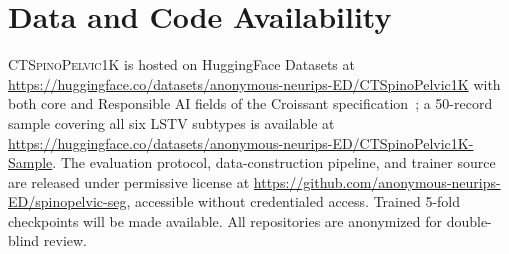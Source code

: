 \documentclass{article}
\newcommand{\dataset}{\textsc{CTSpinoPelvic1K}}
\begin{document}
\section*{Data and Code Availability}

\dataset{} is hosted on HuggingFace Datasets at
\url{https://huggingface.co/datasets/anonymous-neurips-ED/CTSpinoPelvic1K}
with both core and Responsible AI fields of the
Croissant specification~\citep{Akhtar2024Croissant:Datasets};
a 50-record sample covering all six LSTV subtypes is
available at
\url{https://huggingface.co/datasets/anonymous-neurips-ED/CTSpinoPelvic1K-Sample}.
The evaluation protocol, data-construction pipeline, and
trainer source are released under permissive license at
\url{https://github.com/anonymous-neurips-ED/spinopelvic-seg},
accessible without credentialed access. Trained 5-fold
checkpoints will be made available. All repositories are
anonymized for double-blind review.




\newpage

\end{document}
